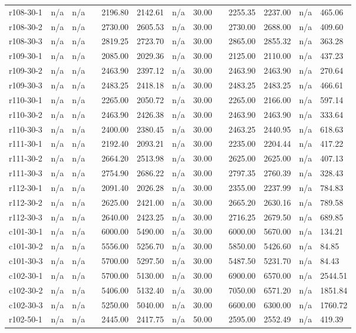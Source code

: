\documentclass[final,5p,times,twocolumn]{elsarticle}
\begin{document}
{{{{{{{{{{{{{\begin{longtable}{l l l l l l l l l l l l l}
r108-30-1& n/a& n/a&&2196.80& 2142.61& n/a& 30.00&&2255.35& 2237.00& n/a& 465.06\\
r108-30-2& n/a& n/a&&2730.00& 2605.53& n/a& 30.00&&2730.00& 2688.00& n/a& 409.60\\
r108-30-3& n/a& n/a&&2819.25& 2723.70& n/a& 30.00&&2865.00& 2855.32& n/a& 363.28\\
r109-30-1& n/a& n/a&&2085.00& 2029.36& n/a& 30.00&&2125.00& 2110.00& n/a& 437.23\\
r109-30-2& n/a& n/a&&2463.90& 2397.12& n/a& 30.00&&2463.90& 2463.90& n/a& 270.64\\
r109-30-3& n/a& n/a&&2483.25& 2418.18& n/a& 30.00&&2483.25& 2483.25& n/a& 466.61\\
r110-30-1& n/a& n/a&&2265.00& 2050.72& n/a& 30.00&&2265.00& 2166.00& n/a& 597.14\\
r110-30-2& n/a& n/a&&2463.90& 2426.38& n/a& 30.00&&2463.90& 2463.90& n/a& 333.64\\
r110-30-3& n/a& n/a&&2400.00& 2380.45& n/a& 30.00&&2463.25& 2440.95& n/a& 618.63\\
r111-30-1& n/a& n/a&&2192.40& 2093.21& n/a& 30.00&&2235.00& 2204.44& n/a& 417.22\\
r111-30-2& n/a& n/a&&2664.20& 2513.98& n/a& 30.00&&2625.00& 2625.00& n/a& 407.13\\
r111-30-3& n/a& n/a&&2754.90& 2686.22& n/a& 30.00&&2797.35& 2760.39& n/a& 328.43\\
r112-30-1& n/a& n/a&&2091.40& 2026.28& n/a& 30.00&&2355.00& 2237.99& n/a& 784.83\\
r112-30-2& n/a& n/a&&2625.00& 2421.00& n/a& 30.00&&2665.20& 2630.16& n/a& 789.58\\
r112-30-3& n/a& n/a&&2640.00& 2423.25& n/a& 30.00&&2716.25& 2679.50& n/a& 689.85\\
c101-30-1& n/a& n/a&&6000.00& 5490.00& n/a& 30.00&&6000.00& 5670.00& n/a& 134.21\\
c101-30-2& n/a& n/a&&5556.00& 5256.70& n/a& 30.00&&5850.00& 5426.60& n/a& 84.85\\
c101-30-3& n/a& n/a&&5700.00& 5297.50& n/a& 30.00&&5487.50& 5231.70& n/a& 84.43\\
c102-30-1& n/a& n/a&&5700.00& 5130.00& n/a& 30.00&&6900.00& 6570.00& n/a& 2544.51\\
c102-30-2& n/a& n/a&&5406.00& 5132.40& n/a& 30.00&&7050.00& 6571.20& n/a& 1851.84\\
c102-30-3& n/a& n/a&&5250.00& 5040.00& n/a& 30.00&&6600.00& 6300.00& n/a& 1760.72\\
r102-50-1& n/a& n/a&&2445.00& 2417.75& n/a& 50.00&&2595.00& 2552.49& n/a& 419.39\\

\end{longtable}}}}}}}}}}}}}}
\end{document}
